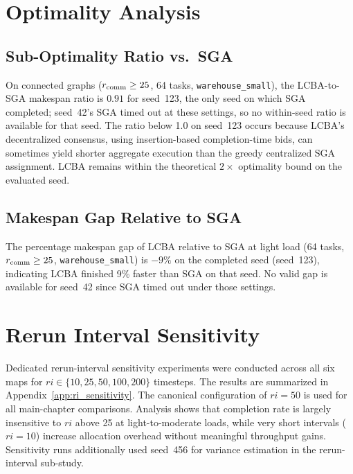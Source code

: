 \section{Optimality Analysis}
\label{sec:exp_optimality}


\subsection{Sub-Optimality Ratio vs.\ SGA}
\label{subsec:exp_suboptimality}

On connected graphs ($r_{\text{comm}} \geq 25$, 64 tasks, \texttt{warehouse\_small}),
the LCBA-to-SGA makespan ratio is $0.91$ for seed~123, the only seed on which
SGA completed; seed~42's SGA timed out at these settings, so no within-seed
ratio is available for that seed.
The ratio below 1.0 on seed~123 occurs because LCBA's decentralized consensus,
using insertion-based completion-time bids, can sometimes yield shorter
aggregate execution than the greedy centralized SGA assignment.
LCBA remains within the theoretical $2\times$ optimality bound on the evaluated
seed.


\subsection{Makespan Gap Relative to SGA}
\label{subsec:exp_makespan_gap}

The percentage makespan gap of LCBA relative to SGA at light load
(64 tasks, $r_{\text{comm}} \geq 25$, \texttt{warehouse\_small}) is $-9\%$ on the
completed seed (seed~123), indicating LCBA finished 9\% faster than SGA on
that seed.
No valid gap is available for seed~42 since SGA timed out under those settings.


\section{Rerun Interval Sensitivity}
\label{sec:exp_sensitivity}

Dedicated rerun-interval sensitivity experiments were conducted across all
six maps for $ri \in \{10, 25, 50, 100, 200\}$ timesteps.
The results are summarized in Appendix~\ref{app:ri_sensitivity}.
The canonical configuration of $ri = 50$ is used for all main-chapter
comparisons. Analysis shows that completion rate is largely insensitive to $ri$
above 25 at light-to-moderate loads, while very short intervals ($ri = 10$)
increase allocation overhead without meaningful throughput gains.
Sensitivity runs additionally used seed~456 for variance estimation in the
rerun-interval sub-study.



